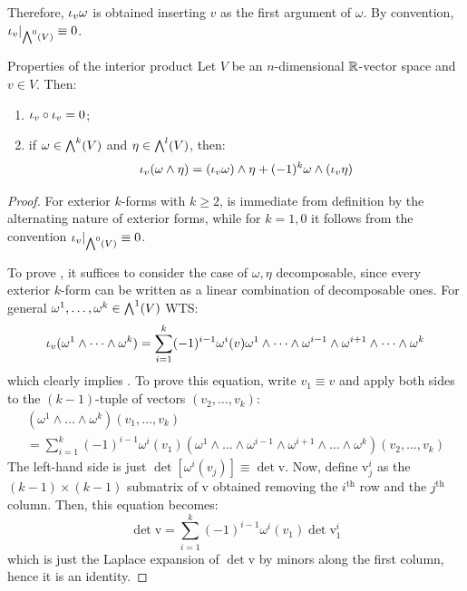 Therefore, $ \iota_v \omega $ is obtained inserting $ v $ as the first argument of $ \omega $. By convention, $ \iota_v \vert_{{\bigwedge}^{0}(V)} \equiv 0 $.

\begin{lemma}{Properties of the interior product}{}
  Let $ V $ be an $ n $-dimensional $ \mathbb{R} $-vector space and $ v \in V $. Then:
  \begin{enumerate}
    \item \label{item:pip-1} $ \iota_v \circ \iota_v = 0 $;
    \item \label{item:pip-2} if $ \omega \in {\bigwedge}^{k}(V) $ and $ \eta \in {\bigwedge}^{l}(V) $, then:
      \begin{equation}
        \iota_v(\omega \wedge \eta) = (\iota_v \omega) \wedge \eta + (-1)^k \omega \wedge (\iota_v \eta)
      \end{equation}
  \end{enumerate}
\end{lemma}

\begin{proofbox}
  \begin{proof}
    For exterior $ k $-forms with $ k \geq 2 $,  is immediate from definition by the alternating nature of exterior forms, while for $ k = 1,0 $ it follows from the convention $ \iota_v \vert_{{\bigwedge}^{0}(V)} \equiv 0 $.

    To prove , it suffices to consider the case of $ \omega , \eta $ decomposable, since every exterior $ k $-form can be written as a linear combination of decomposable ones. For general $ \omega^1 , \dots , \omega^k \in {\bigwedge}^{1}(V) $ WTS:
    \begin{equation}
      \iota_v(\omega^1 \wedge \dots \wedge \omega^k) = \sum_{i = 1}^k (-1)^{i-1} \omega^i(v) \omega^1 \wedge \dots \wedge \omega^{i-1} \wedge \omega^{i+1} \wedge \dots \wedge \omega^k
    \end{equation}
    which clearly implies . To prove this equation, write $ v_1 \equiv v $ and apply both sides to the $ (k-1) $-tuple of vectors $ (v_2 , \dots , v_k) $:
    \begin{multline*}
      (\omega^1 \wedge \dots \wedge \omega^k)(v_1 , \dots , v_k) \\
      = \sum_{i = 1}^k (-1)^{i-1} \omega^i(v_1) (\omega^1 \wedge \dots \wedge \omega^{i-1} \wedge \omega^{i+1} \wedge \dots \wedge \omega^k)(v_2 , \dots , v_k)
    \end{multline*}
    The left-hand side is just $ \det [\omega^i(v_j)] \equiv \det \mathrm{v} $. Now, define $ \mathrm{v}^i_j $ as the $ (k-1) \times (k-1) $ submatrix of $ \mathrm{v} $ obtained removing the $ i^\text{th} $ row and the $ j^\text{th} $ column. Then, this equation becomes:
    \begin{equation*}
      \det \mathrm{v} = \sum_{i = 1}^k (-1)^{i-1} \omega^i(v_1) \det \mathrm{v}^i_1
    \end{equation*}
    which is just the Laplace expansion of $ \det \mathrm{v} $ by minors along the first column, hence it is an identity.
  \end{proof}
\end{proofbox}

